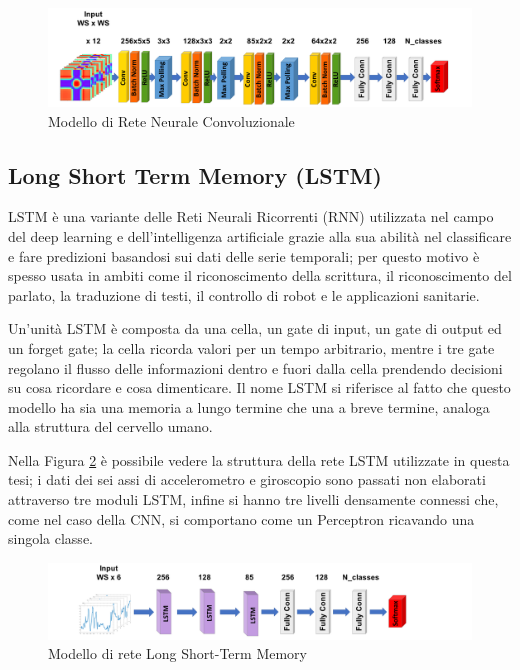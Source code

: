 \begin{figure}[!htb]
    \centering
    \includegraphics[width=\textwidth]{figure/cnn_model.png}
    \caption{Modello di Rete Neurale Convoluzionale}
    \label{fig:cnn-model}
\end{figure}

\subsection{Long Short Term Memory (LSTM)}

LSTM è una variante delle Reti Neurali Ricorrenti (RNN) utilizzata nel campo del deep learning e dell'intelligenza artificiale grazie alla sua abilità nel classificare e fare predizioni basandosi sui dati delle serie temporali; per questo motivo è spesso usata in ambiti come il riconoscimento della scrittura, il riconoscimento del parlato, la traduzione di testi, il controllo di robot e le applicazioni sanitarie.

Un'unità LSTM è composta da una cella, un gate di input, un gate di output ed un forget gate; la cella ricorda valori per un tempo arbitrario, mentre i tre gate regolano il flusso delle informazioni dentro e fuori dalla cella prendendo decisioni su cosa ricordare e cosa dimenticare. Il nome LSTM si riferisce al fatto che questo modello ha sia una memoria a lungo termine che una a breve termine, analoga alla struttura del cervello umano.

Nella Figura \ref{fig:lstm-model} è possibile vedere la struttura della rete LSTM utilizzate in questa tesi; i dati dei sei assi di accelerometro e giroscopio sono passati non elaborati attraverso tre moduli LSTM, infine si hanno tre livelli densamente connessi che, come nel caso della CNN, si comportano come un Perceptron ricavando una singola classe.

\begin{figure}[!htb]
    \centering
    \includegraphics[width=\textwidth]{figure/lstm_model.png}
    \caption{Modello di rete Long Short-Term Memory}
    \label{fig:lstm-model}
\end{figure}

